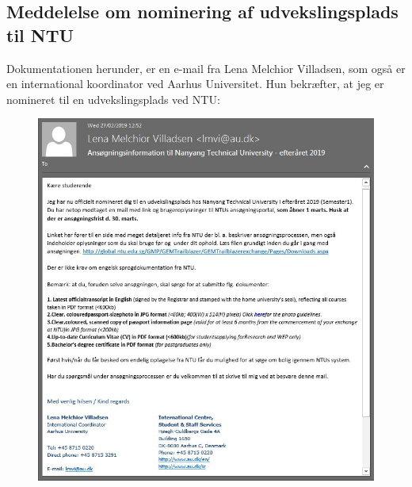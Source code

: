\documentclass[../Ansoegning.tex]{subfiles}
\begin{document}
\subsection*{Meddelelse om nominering af udvekslingsplads til NTU}
Dokumentationen herunder, er en e-mail fra Lena Melchior Villadsen, som også er en international koordinator ved Aarhus Universitet. Hun bekræfter, at jeg er nomineret til en udvekslingsplads ved NTU:
\begin{figure}[H]
	\centering
	\includegraphics[width=1\textwidth]{Eksterne_filer/dokumentation2.JPG}
\end{figure}
    \newpage
\end{document}
